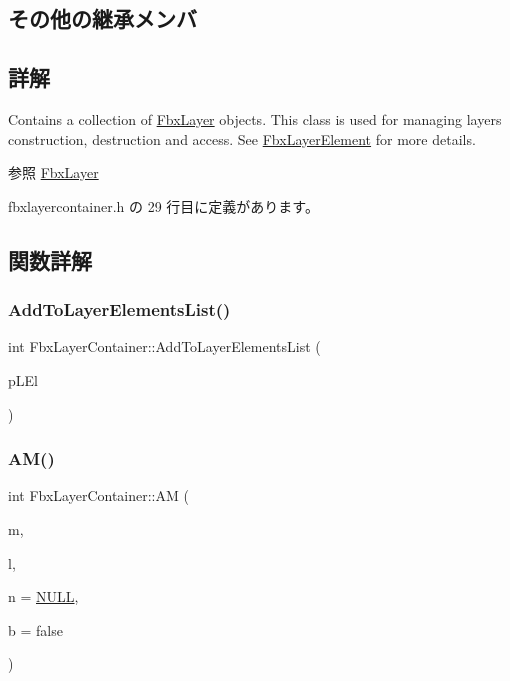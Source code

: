\subsection*{その他の継承メンバ}


\subsection{詳解}
Contains a collection of \hyperlink{class_fbx_layer}{Fbx\+Layer} objects. This class is used for managing layers construction, destruction and access. See \hyperlink{class_fbx_layer_element}{Fbx\+Layer\+Element} for more details. 

\begin{DoxySeeAlso}{参照}
\hyperlink{class_fbx_layer}{Fbx\+Layer} 
\end{DoxySeeAlso}


 fbxlayercontainer.\+h の 29 行目に定義があります。



\subsection{関数詳解}
\mbox{\label{class_fbx_layer_container_abceae8ff9bf083667013f1ec101d04ce}} 
\subsubsection{\texorpdfstring{Add\+To\+Layer\+Elements\+List()}{AddToLayerElementsList()}}
{\footnotesize\ttfamily int Fbx\+Layer\+Container\+::\+Add\+To\+Layer\+Elements\+List (\begin{DoxyParamCaption}\item[{\hyperlink{class_fbx_layer_element}{Fbx\+Layer\+Element} $\ast$}]{p\+L\+El }\end{DoxyParamCaption})}

\mbox{\label{class_fbx_layer_container_a273820824e7c6db2b40dabfb44c3ca5b}} 
\subsubsection{\texorpdfstring{A\+M()}{AM()}}
{\footnotesize\ttfamily int Fbx\+Layer\+Container\+::\+AM (\begin{DoxyParamCaption}\item[{void $\ast$}]{m,  }\item[{\hyperlink{fbxtypes_8h_ae9fb141d8158a730aa85ec5ff2ea3f6b}{Fbx\+U\+Int}}]{l,  }\item[{void $\ast$}]{n = {\ttfamily \hyperlink{fbxarch_8h_a070d2ce7b6bb7e5c05602aa8c308d0c4}{N\+U\+LL}},  }\item[{bool}]{b = {\ttfamily false} }\end{DoxyParamCaption})}


